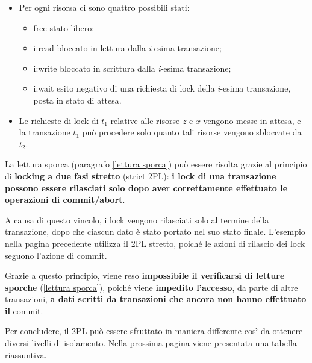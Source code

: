 \documentclass[a4paper]{article}
\begin{document}
	\noindent
	\begin{itemize}
		\item Per ogni risorsa ci sono quattro possibili stati:
		\begin{itemize}
			\item \textsf{free} stato libero;
			
			\item \textsf{i:read} bloccato in lettura dalla \emph{i}-esima transazione;
			
			\item \textsf{i:write} bloccato in scrittura dalla \emph{i}-esima transazione;
			
			\item \textsf{i:wait} esito negativo di una richiesta di lock della \emph{i}-esima transazione, posta in stato di attesa.
		\end{itemize}
	
		\item Le richieste di lock di $t_{1}$ relative alle risorse $z$ e $x$ vengono messe in attesa, e la transazione $t_{1}$ può procedere solo quanto tali risorse vengono sbloccate da $t_{2}$.
	\end{itemize}\newpage

	\noindent
	La lettura sporca (paragrafo \ref{lettura sporca}) può essere risolta grazie al principio di \textcolor{Red3}{\textbf{locking a due fasi stretto}} (strict 2PL): \textbf{i lock di una transazione possono essere rilasciati solo dopo aver correttamente effettuato le operazioni di \textsf{commit}/\textsf{abort}}.\newline
	
	\noindent
	A causa di questo vincolo, i lock vengono rilasciati solo al termine della transazione, dopo che ciascun dato è stato portato nel suo stato finale. L'esempio nella pagina precedente utilizza il 2PL stretto, poiché le azioni di rilascio dei lock seguono l'azione di \textsf{commit}.\newline
	
	\noindent
	Grazie a questo principio, viene reso \textbf{impossibile il verificarsi di letture sporche} (\ref{lettura sporca}), poiché viene \textbf{impedito l'accesso}, da parte di altre transazioni, \textbf{a dati scritti da transazioni che ancora non hanno effettuato il} \textsf{commit}.\newline
	
	\noindent
	Per concludere, il 2PL può essere sfruttato in maniera differente così da ottenere diversi livelli di isolamento. Nella prossima pagina viene presentata una tabella riassuntiva.
	
\end{document}
